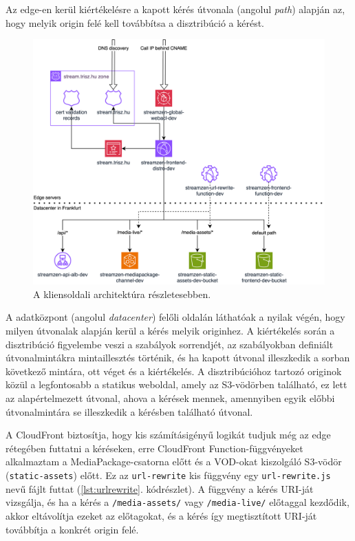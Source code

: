 Az edge-en kerül kiértékelésre a kapott kérés útvonala (angolul \emph{path}) alapján az, hogy melyik origin felé kell továbbítsa a disztribúció a kérést.

\begin{figure}[h]
  \centering
  \includegraphics[width=150mm, keepaspectratio]{figures/dipterv_client.png}
  \caption{A kliensoldali architektúra részletesebben.}
  \label{fig:client}
\end{figure}

A  adatközpont (angolul \emph{datacenter}) felőli oldalán láthatóak a nyilak végén, hogy milyen útvonalak alapján kerül a kérés melyik originhez. A kiértékelés során a disztribúció figyelembe veszi a szabályok sorrendjét, az szabályokban definiált útvonalmintákra mintaillesztés történik, és ha kapott útvonal illeszkedik a sorban következő mintára, ott véget és a kiértékelés. A disztribúcióhoz tartozó originok közül a legfontosabb a statikus weboldal, amely az S3-vödörben található, ez lett az alapértelmezett útvonal, ahova a kérések mennek, amennyiben egyik előbbi útvonalmintára se illeszkedik a kérésben található útvonal.

A CloudFront biztosítja, hogy kis számításigényű logikát tudjuk még az edge rétegében futtatni a kéréseken, erre CloudFront Function-függvényeket alkalmaztam a MediaPackage-csatorna előtt és a VOD-okat kiszolgáló S3-vödör (\verb|static-assets|) előtt. Ez az \verb|url-rewrite| kis függvény egy \verb|url-rewrite.js| nevű fájlt futtat (\ref{lst:urlrewrite}. kódrészlet). A függvény a kérés URI-ját vizsgálja, és ha a kérés a \verb|/media-assets/| vagy \verb|/media-live/| előtaggal kezdődik, akkor eltávolítja ezeket az előtagokat, és a kérés így megtisztított URI-ját továbbítja a konkrét origin felé.

